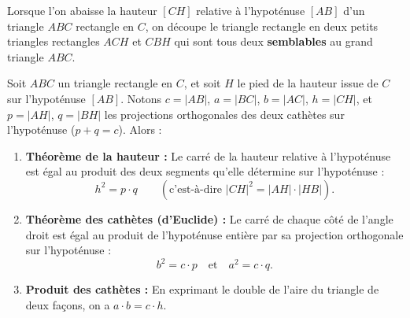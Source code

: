 Lorsque l'on abaisse la hauteur $[CH]$ relative à l'hypoténuse $[AB]$ d'un triangle $ABC$ rectangle en $C$, on découpe le triangle rectangle en deux petits triangles rectangles $ACH$ et $CBH$ qui sont tous deux \textbf{semblables} au grand triangle $ABC$.

\begin{theoreme}
Soit $ABC$ un triangle rectangle en $C$, et soit $H$ le pied de la hauteur issue de $C$ sur l'hypoténuse $[AB]$. Notons $c = |AB|$, $a = |BC|$, $b = |AC|$, $h = |CH|$, et $p = |AH|$, $q = |BH|$ les projections orthogonales des deux cathètes sur l'hypoténuse ($p + q = c$). Alors :
\begin{enumerate}
    \item \textbf{Théorème de la hauteur :} Le carré de la hauteur relative à l'hypoténuse est égal au produit des deux segments qu'elle détermine sur l'hypoténuse :
    \[
        \boxed{h^2 = p \cdot q \qquad \left(\text{c'est-à-dire } |CH|^2 = |AH| \cdot |HB|\right)}.
    \]
    \item \textbf{Théorème des cathètes (d'Euclide) :} Le carré de chaque côté de l'angle droit est égal au produit de l'hypoténuse entière par sa projection orthogonale sur l'hypoténuse :
    \[
        \boxed{b^2 = c \cdot p \quad \text{et} \quad a^2 = c \cdot q}.
    \]
    \item \textbf{Produit des cathètes :} En exprimant le double de l'aire du triangle de deux façons, on a $a \cdot b = c \cdot h$.
\end{enumerate}
\end{theoreme}

\begin{center}
\end{center}

